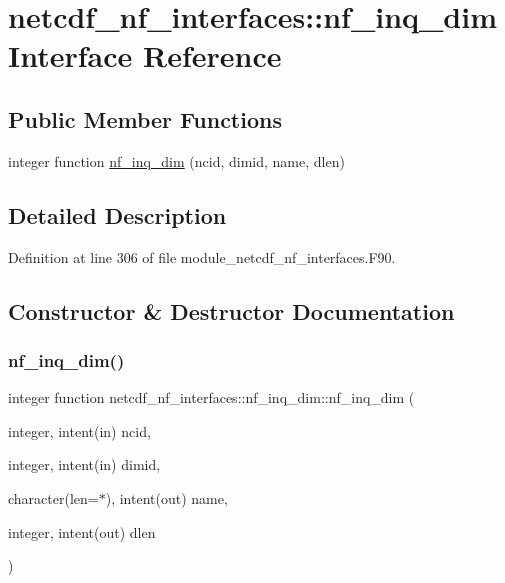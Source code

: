 \hypertarget{interfacenetcdf__nf__interfaces_1_1nf__inq__dim}{}\section{netcdf\+\_\+nf\+\_\+interfaces\+:\+:nf\+\_\+inq\+\_\+dim Interface Reference}
\label{interfacenetcdf__nf__interfaces_1_1nf__inq__dim}
\subsection*{Public Member Functions}
\begin{DoxyCompactItemize}
\item 
integer function \hyperlink{interfacenetcdf__nf__interfaces_1_1nf__inq__dim_a66e72f36c7c8431a19edbe63642f498d}{nf\+\_\+inq\+\_\+dim} (ncid, dimid, name, dlen)
\end{DoxyCompactItemize}


\subsection{Detailed Description}


Definition at line 306 of file module\+\_\+netcdf\+\_\+nf\+\_\+interfaces.\+F90.



\subsection{Constructor \& Destructor Documentation}
\mbox{\label{interfacenetcdf__nf__interfaces_1_1nf__inq__dim_a66e72f36c7c8431a19edbe63642f498d}} 
\subsubsection{\texorpdfstring{nf\+\_\+inq\+\_\+dim()}{nf\_inq\_dim()}}
{\footnotesize\ttfamily integer function netcdf\+\_\+nf\+\_\+interfaces\+::nf\+\_\+inq\+\_\+dim\+::nf\+\_\+inq\+\_\+dim (\begin{DoxyParamCaption}\item[{integer, intent(in)}]{ncid,  }\item[{integer, intent(in)}]{dimid,  }\item[{character(len=$\ast$), intent(out)}]{name,  }\item[{integer, intent(out)}]{dlen }\end{DoxyParamCaption})}



